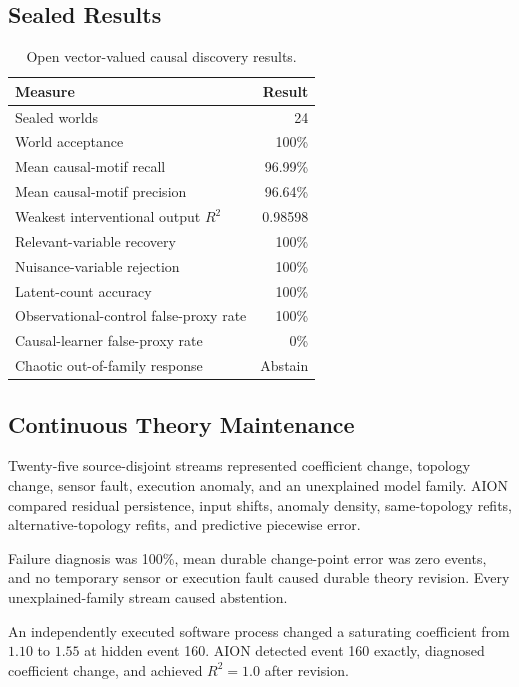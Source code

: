 \subsection{Sealed Results}

\begin{table}[htbp]
\centering
\begin{tabular}{lr}
\hline
\textbf{Measure} & \textbf{Result}\\
\hline
Sealed worlds & 24\\
World acceptance & 100\%\\
Mean causal-motif recall & 96.99\%\\
Mean causal-motif precision & 96.64\%\\
Weakest interventional output \(R^2\) & 0.98598\\
Relevant-variable recovery & 100\%\\
Nuisance-variable rejection & 100\%\\
Latent-count accuracy & 100\%\\
Observational-control false-proxy rate & 100\%\\
Causal-learner false-proxy rate & 0\%\\
Chaotic out-of-family response & Abstain\\
\hline
\end{tabular}
\caption{Open vector-valued causal discovery results.}
\end{table}

\subsection{Continuous Theory Maintenance}

Twenty-five source-disjoint streams represented coefficient change, topology
change, sensor fault, execution anomaly, and an unexplained model family. AION
compared residual persistence, input shifts, anomaly density, same-topology
refits, alternative-topology refits, and predictive piecewise error.

Failure diagnosis was 100\%, mean durable change-point error was zero events,
and no temporary sensor or execution fault caused durable theory revision.
Every unexplained-family stream caused abstention.

An independently executed software process changed a saturating coefficient
from \(1.10\) to \(1.55\) at hidden event 160. AION detected event 160 exactly,
diagnosed coefficient change, and achieved \(R^2=1.0\) after revision.

